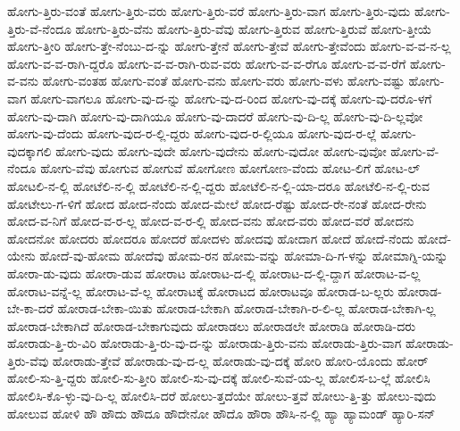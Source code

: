 {ಹೋಗು-ತ್ತಿರು-ವಂತೆ
ಹೋಗು-ತ್ತಿರು-ವರು
ಹೋಗು-ತ್ತಿರು-ವರೆ
ಹೋಗು-ತ್ತಿರು-ವಾಗ
ಹೋಗು-ತ್ತಿರು-ವುದು
ಹೋಗು-ತ್ತಿರು-ವೆ-ನೆಂದೂ
ಹೋಗು-ತ್ತಿರು-ವೆನು
ಹೋಗು-ತ್ತಿರು-ವೆವು
ಹೋಗು-ತ್ತಿರುವ
ಹೋಗು-ತ್ತಿರುವೆ
ಹೋಗು-ತ್ತೀಯೆ
ಹೋಗು-ತ್ತೀರಿ
ಹೋಗು-ತ್ತೇ-ನೆಂಬು-ದ-ನ್ನು
ಹೋಗು-ತ್ತೇನೆ
ಹೋಗು-ತ್ತೇವೆ
ಹೋಗು-ತ್ತೇವೆಂದು
ಹೋಗು-ವ-ವ-ನ-ಲ್ಲ
ಹೋಗು-ವ-ವ-ರಾಗಿ-ದ್ದರೊ
ಹೋಗು-ವ-ವ-ರಾಗಿ-ರುವ-ವರು
ಹೋಗು-ವ-ವ-ರೆಗೂ
ಹೋಗು-ವ-ವ-ರೆಗೆ
ಹೋಗು-ವ-ವನು
ಹೋಗು-ವಂತಹ
ಹೋಗು-ವಂತೆ
ಹೋಗು-ವನು
ಹೋಗು-ವರು
ಹೋಗು-ವಳು
ಹೋಗು-ವಷ್ಟು
ಹೋಗು-ವಾಗ
ಹೋಗು-ವಾಗಲೂ
ಹೋಗು-ವು-ದ-ನ್ನು
ಹೋಗು-ವು-ದ-ರಿಂದ
ಹೋಗು-ವು-ದಕ್ಕೆ
ಹೋಗು-ವು-ದರೊ-ಳಗೆ
ಹೋಗು-ವು-ದಾಗಿ
ಹೋಗು-ವು-ದಾಗಿಯೂ
ಹೋಗು-ವು-ದಾದರೆ
ಹೋಗು-ವು-ದಿ-ಲ್ಲ
ಹೋಗು-ವು-ದಿ-ಲ್ಲವೋ
ಹೋಗು-ವು-ದೆಂದು
ಹೋಗು-ವುದ-ರ-ಲ್ಲಿ-ದ್ದರು
ಹೋಗು-ವುದ-ರ-ಲ್ಲಿಯೂ
ಹೋಗು-ವುದ-ರ-ಲ್ಲೆ
ಹೋಗು-ವುದಕ್ಕಾಗಲಿ
ಹೋಗು-ವುದು
ಹೋಗು-ವುದೇ
ಹೋಗು-ವುದೇನು
ಹೋಗು-ವುದೋ
ಹೋಗು-ವುವೋ
ಹೋಗು-ವೆ-ನೆಂದೂ
ಹೋಗು-ವೆವು
ಹೋಗುವ
ಹೋಗುವೆ
ಹೋಗೋಣ
ಹೋಗೋಣ-ವೆಂದು
ಹೋಟ-ಲಿಗೆ
ಹೋಟ-ಲ್
ಹೋಟಲಿ-ನ-ಲ್ಲಿ
ಹೋಟೆಲಿ-ನ-ಲ್ಲಿ
ಹೋಟೆಲಿ-ನ-ಲ್ಲಿ-ದ್ದರು
ಹೋಟೆಲಿ-ನ-ಲ್ಲಿ-ಯಾ-ದರೂ
ಹೋಟೆಲಿ-ನ-ಲ್ಲಿ-ರುವ
ಹೋಟೇಲು-ಗ-ಳಿಗೆ
ಹೋದ
ಹೋದ-ನೆಂದು
ಹೋದ-ಮೇಲೆ
ಹೋದ-ರೆಷ್ಟು
ಹೋದ-ರೇ-ನಂತೆ
ಹೋದ-ರೇನು
ಹೋದ-ವ-ನಿಗೆ
ಹೋದ-ವ-ರ-ಲ್ಲ
ಹೋದ-ವ-ರ-ಲ್ಲಿ
ಹೋದ-ವನು
ಹೋದ-ವರು
ಹೋದ-ವರೆ
ಹೋದನು
ಹೋದನೋ
ಹೋದರು
ಹೋದರೂ
ಹೋದರೆ
ಹೋದಳು
ಹೋದವು
ಹೋದಾಗ
ಹೋದೆ
ಹೋದೆ-ನೆಂದು
ಹೋದೆ-ಯೇನು
ಹೋದೆ-ವು-ಹೋಮ
ಹೋದೆವು
ಹೋಮ-ರನ
ಹೋಮ-ವನ್ನು
ಹೋಮಾ-ದಿ-ಗ-ಳನ್ನು
ಹೋಮಾಗ್ನಿ-ಯನ್ನು
ಹೋರಾ-ಡು-ವುದು
ಹೋರಾ-ಡುವ
ಹೋರಾಟ
ಹೋರಾಟ-ದ-ಲ್ಲಿ
ಹೋರಾಟ-ದ-ಲ್ಲಿ-ದ್ದಾಗ
ಹೋರಾಟ-ವ-ಲ್ಲ
ಹೋರಾಟ-ವನ್ನೆ-ಲ್ಲ
ಹೋರಾಟ-ವೆ-ಲ್ಲ
ಹೋರಾಟಕ್ಕೆ
ಹೋರಾಟದ
ಹೋರಾಟವೂ
ಹೋರಾಡ-ಬ-ಲ್ಲರು
ಹೋರಾಡ-ಬೇ-ಕಾ-ದರೆ
ಹೋರಾಡ-ಬೇಕಾ-ಯಿತು
ಹೋರಾಡ-ಬೇಕಾಗಿ
ಹೋರಾಡ-ಬೇಕಾಗಿ-ರ-ಲಿ-ಲ್ಲ
ಹೋರಾಡ-ಬೇಕಾಗಿ-ಲ್ಲ
ಹೋರಾಡ-ಬೇಕಾಗಿದೆ
ಹೋರಾಡ-ಬೇಕಾಗುವುದು
ಹೋರಾಡಲು
ಹೋರಾಡಲೇ
ಹೋರಾಡಿ
ಹೋರಾಡಿ-ದರು
ಹೋರಾಡು-ತ್ತಿ-ರು-ವಿರಿ
ಹೋರಾಡು-ತ್ತಿ-ರು-ವು-ದ-ನ್ನು
ಹೋರಾಡು-ತ್ತಿರು-ವನು
ಹೋರಾಡು-ತ್ತಿರು-ವಾಗ
ಹೋರಾಡು-ತ್ತಿರು-ವೆವು
ಹೋರಾಡು-ತ್ತೇವೆ
ಹೋರಾಡು-ವು-ದ-ಲ್ಲ
ಹೋರಾಡು-ವು-ದಕ್ಕೆ
ಹೋರಿ
ಹೋರಿ-ಯೊಂದು
ಹೋರ್
ಹೋಲಿ-ಸು-ತ್ತಿ-ದ್ದರು
ಹೋಲಿ-ಸು-ತ್ತೀರಿ
ಹೋಲಿ-ಸು-ವು-ದಕ್ಕೆ
ಹೋಲಿ-ಸುವೆ-ಯ-ಲ್ಲ
ಹೋಲಿಸ-ಬ-ಲ್ಲೆ
ಹೋಲಿಸಿ
ಹೋಲಿಸಿ-ಕೊ-ಳ್ಳು-ವು-ದಿ-ಲ್ಲ
ಹೋಲಿಸಿ-ದರೆ
ಹೋಲು-ತ್ತದೆಯೇ
ಹೋಲು-ತ್ತವೆ
ಹೋಲು-ತ್ತಿ-ತ್ತು
ಹೋಲು-ವುದು
ಹೋಲುವ
ಹೋಳಿ
ಹೌ
ಹೌದು
ಹೌದೂ
ಹೌದೇನೋ
ಹೌದೊ
ಹೌರಾ
ಹೌಸಿ-ನ-ಲ್ಲಿ
ಹ್ಯಾ
ಹ್ಯಾಮಂಡ್
ಹ್ಯಾರಿ-ಸನ್
}
